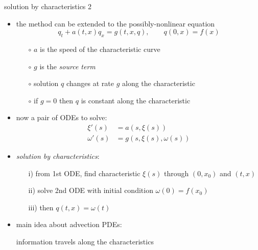 \documentclass[10pt,hyperref,dvipsnames]{beamer}
\begin{document}
\begin{frame}{solution by characteristics 2}

\begin{itemize}
\item the method can be extended to the possibly-nonlinear equation
     $$q_t + a(t,x) q_x = g(t,x,q), \qquad q(0,x) = f(x)$$

    \begin{itemize}
    \item[$\circ$] $a$ is the speed of the characteristic curve
    \item[$\circ$] $g$ is the \emph{source term}
    \item[$\circ$] solution $q$ changes at rate $g$ along the characteristic
    \item[$\circ$] if $g=0$ then $q$ is constant along the characteristic
    \end{itemize}
\item now a pair of ODEs to solve:
\begin{align*}
\xi'(s) &= a(s,\xi(s)) \\
\omega'(s) &= g(s,\xi(s),\omega(s))
\end{align*}
\item \emph{solution by characteristics}:
    \begin{itemize}
    \item[i)] from 1st ODE, find characteristic $\xi(s)$ through $(0,x_0)$ and $(t,x)$
    \item[ii)] solve 2nd ODE with initial condition $\omega(0)=f(x_0)$
    \item[iii)] then $q(t,x) = \omega(t)$
    \end{itemize}
\item \alert{main idea} about advection PDEs:

\begin{center}
information travels along the characteristics
\end{center}
\end{itemize}
\end{frame}
\end{document}
